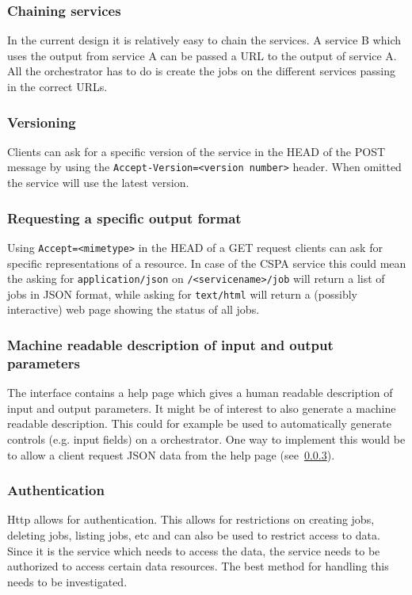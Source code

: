 \documentclass[a4paper]{article}
\begin{document}
\subsubsection{Chaining services}
In the current design it is relatively easy to chain the services. A service B
which uses the output from service A can be passed a URL to the output of
service A. All the orchestrator has to do is create the jobs on the different
services passing in the correct URLs. 

\subsubsection{Versioning}
Clients can ask for a specific version of the service in the HEAD of the POST
message by using the \texttt{Accept-Version=<version number>} header. When
omitted the service will use the latest version.


\subsubsection{Requesting a specific output format}
\label{sec:outputformat}
Using \texttt{Accept=<mimetype>} in the HEAD of a GET request clients can ask for
specific representations of a resource. In case of the CSPA service this could
mean the asking for \texttt{application/json} on \texttt{/<servicename>/job}
will return a list of jobs in JSON format, while asking for \texttt{text/html}
will return a (possibly interactive) web page showing the status of all jobs.


\subsubsection{Machine readable description of input and output parameters}
The interface contains a help page which gives a human readable description of
input and output parameters. It might be of interest to also
generate a machine readable description. This could for example be used to
automatically generate controls (e.g. input fields) on a orchestrator. One way
to implement this would be to allow a client request JSON data from the help
page (see~\ref{sec:outputformat}). 


\subsubsection{Authentication}
Http allows for authentication. This allows for restrictions on creating jobs,
deleting jobs, listing jobs, etc and can also be used to restrict access to
data. Since it is the service which needs to access the data, the service needs
to be authorized to access certain data resources. The best method for handling
this needs to be investigated. 
\end{document}
